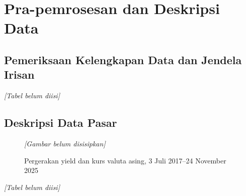     \section{Pra-pemrosesan dan Deskripsi Data}\label{sec:data}

        \subsection{Pemeriksaan Kelengkapan Data dan Jendela Irisan}\label{subsec:data completeness}

        \begin{table}[H]
            \centering
            \caption{Ringkasan data pasar dan blok data hilang}\label{tab:data summary}
            \textit{[Tabel belum diisi]}
        \end{table}

        \subsection{Deskripsi Data Pasar}\label{subsec:market description}

        \begin{figure}[H]
            \centering
            \textit{[Gambar belum disisipkan]}
            \caption{Pergerakan yield dan kurs valuta asing, 3 Juli 2017–24 November 2025}\label{fig:market timeseries}
        \end{figure}

        \begin{table}[H]
            \centering
            \caption{Statistik deskriptif data pasar}\label{tab:market stats}
            \textit{[Tabel belum diisi]}
        \end{table}


